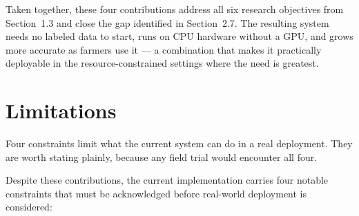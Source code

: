 \documentclass[12pt,a4paper,oneside]{report}
\begin{document}
Taken together, these four contributions address all six research objectives from Section~1.3 and close the gap identified in Section~2.7. The resulting system needs no labeled data to start, runs on CPU hardware without a GPU, and grows more accurate as farmers use it — a combination that makes it practically deployable in the resource-constrained settings where the need is greatest.

\section{Limitations}

Four constraints limit what the current system can do in a real deployment. They are worth stating plainly, because any field trial would encounter all four.

Despite these contributions, the current implementation carries four notable
constraints that must be acknowledged before real-world deployment is considered:
\end{document}
